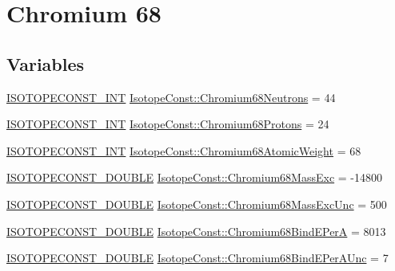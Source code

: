 \hypertarget{group___isotope_const-_chromium-_cr68}{}\section{Chromium 68}
\label{group___isotope_const-_chromium-_cr68}
\subsection*{Variables}
\begin{DoxyCompactItemize}
\item 
\mbox{\hyperlink{group___isotope_const-_macros_ga5f18360b3e99483a35c32d789e62621c}{I\+S\+O\+T\+O\+P\+E\+C\+O\+N\+S\+T\+\_\+\+I\+NT}} \mbox{\hyperlink{group___isotope_const-_chromium-_cr68_gaa2f89bb71f9af8ffb4f0e93fc584a21b}{Isotope\+Const\+::\+Chromium68\+Neutrons}} = 44
\item 
\mbox{\hyperlink{group___isotope_const-_macros_ga5f18360b3e99483a35c32d789e62621c}{I\+S\+O\+T\+O\+P\+E\+C\+O\+N\+S\+T\+\_\+\+I\+NT}} \mbox{\hyperlink{group___isotope_const-_chromium-_cr68_ga58fb4af86b9194c1e672664cc5801c34}{Isotope\+Const\+::\+Chromium68\+Protons}} = 24
\item 
\mbox{\hyperlink{group___isotope_const-_macros_ga5f18360b3e99483a35c32d789e62621c}{I\+S\+O\+T\+O\+P\+E\+C\+O\+N\+S\+T\+\_\+\+I\+NT}} \mbox{\hyperlink{group___isotope_const-_chromium-_cr68_ga0705369aeb6ce8d96ebf54c302bc6d21}{Isotope\+Const\+::\+Chromium68\+Atomic\+Weight}} = 68
\item 
\mbox{\hyperlink{group___isotope_const-_macros_ga8f45a7272ce02c0b4c65c44636ed719a}{I\+S\+O\+T\+O\+P\+E\+C\+O\+N\+S\+T\+\_\+\+D\+O\+U\+B\+LE}} \mbox{\hyperlink{group___isotope_const-_chromium-_cr68_gafe89a4365c059ca66027629ffa0ed454}{Isotope\+Const\+::\+Chromium68\+Mass\+Exc}} = -\/14800
\item 
\mbox{\hyperlink{group___isotope_const-_macros_ga8f45a7272ce02c0b4c65c44636ed719a}{I\+S\+O\+T\+O\+P\+E\+C\+O\+N\+S\+T\+\_\+\+D\+O\+U\+B\+LE}} \mbox{\hyperlink{group___isotope_const-_chromium-_cr68_ga4ecf962cb0f5ea9c91a762ccf3fa2b38}{Isotope\+Const\+::\+Chromium68\+Mass\+Exc\+Unc}} = 500
\item 
\mbox{\hyperlink{group___isotope_const-_macros_ga8f45a7272ce02c0b4c65c44636ed719a}{I\+S\+O\+T\+O\+P\+E\+C\+O\+N\+S\+T\+\_\+\+D\+O\+U\+B\+LE}} \mbox{\hyperlink{group___isotope_const-_chromium-_cr68_ga331404e3b81dfa4752ef4bbb311eba5a}{Isotope\+Const\+::\+Chromium68\+Bind\+E\+PerA}} = 8013
\item 
\mbox{\hyperlink{group___isotope_const-_macros_ga8f45a7272ce02c0b4c65c44636ed719a}{I\+S\+O\+T\+O\+P\+E\+C\+O\+N\+S\+T\+\_\+\+D\+O\+U\+B\+LE}} \mbox{\hyperlink{group___isotope_const-_chromium-_cr68_gaae283dac2a15e6760900dfdda30dc78b}{Isotope\+Const\+::\+Chromium68\+Bind\+E\+Per\+A\+Unc}} = 7

\end{DoxyCompactItemize}
